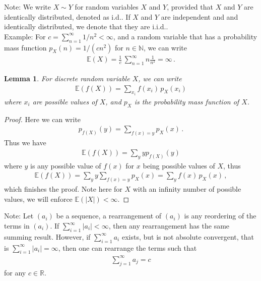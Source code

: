 \documentclass[11pt, onesided]{book}
\theoremstyle{break}
\theoremstyle{break}
\newtheorem{lem}{Lemma}[thm]
\newcommand{\R}{\mathbb{R}}
\newcommand{\N}{\mathbb{N}}
\newcommand{\note}{\color{red}Note: \color{black}}
\newcommand{\example}{\color{green}Example: \color{black}}
\begin{document}
\note We write $X\sim Y$ for random variables $X$ and $Y$, provided that $X$ and $Y$ are identically distributed, denoted as i.d.. If $X$ and $Y$ are independent and and identically distributed, we denote that they are i.i.d..\\

\example For $c = \sum_{n=1}^\infty 1/n^2 < \infty$, and a random variable that has a probability mass function $p_X(n) = 1/(cn^2)$ for $n \in \N$, we can write
\begin{align*}
\mathbb{E}(X) = \frac{1}{c}\, \sum_{n=1}^\infty n \frac{1}{n^2} = \infty\,.
\end{align*}

\begin{lem}
For discrete random variable $X$, we can write
\begin{align*}
\mathbb{E}(f(X)) = \sum_{x_i} f(x_i)\, p_X(x_i)
\end{align*}
where $x_i$ are possible values of $X$, and $p_X$ is the probability mass function of $X$. 
\end{lem}
\begin{proof}
Here we can write
\begin{align*}
p_{f(X)}(y) = \sum_{f(x) =y} p_X(x)\,.
\end{align*}
Thus we have
\begin{align*}
\mathbb{E}(f(X)) = \sum_{y}y p_{f(X)}(y)
\end{align*}
where $y$ is any possible value of $f(x)$ for $x$ being possible values of $X$, thus
\begin{align*}
\mathbb{E}(f(X)) = \sum_y y\sum_{f(x) = y}p_X(x) = \sum_y f(x)\, p_X(x)\,,
\end{align*} 
which finishes the proof. Note here for $X$ with an infinity number of possible values, we will enforce $\mathbb{E}(|X|) < \infty$. 
\end{proof}


\note Let $(a_i)$ be a sequence, a rearrangement of $(a_i)$ is any reordering of the terms in $(a_i)$. If $\sum_{i=1}^\infty |a_i|<\infty$, then any rearrangement has the same summing result. However, if $\sum_{i=1}^\infty a_i$ exists, but is not absolute convergent, that is $\sum_{i=1}^\infty |a_i| = \infty$, then one can rearrange the terms such that 
\begin{align*}
\sum_{j=1}^\infty a_j = c
\end{align*}
for any $c \in \R$. 
\end{document}
